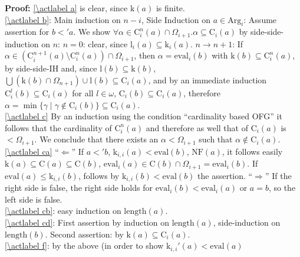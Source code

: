 \documentclass[10pt]{article}
\def \refsub#1#2{\ref{#1#2}}                    %
\def \refact#1{\ref{\actlabel#1}}               %
\def \refcom#1#2{\ref{#1}\ \ref{#1#2}}%
\def\all{\forall}
\def\ar{\rightarrow}
\def \Ar{\Rightarrow}
\def\length{\mathrm{length}}
\def\Arg{\mathrm{Arg}}
\def\k{\mathrm{k}}
\def\lrm{\mathrm{l}}
\def\eval{\mathrm{eval}}
\def\C{\mathrm{C}}
\def\NF{\mathrm{NF}}
\begin{document}
%
%
%
{\bf Proof:} \refact a is clear, since $\k(a)$ is finite.\\ 
\refact b: Main induction on $n-i$, Side Induction on $a \in \Arg_i$:
Assume assertion for $b <' a$. We show 
$\all \alpha  \in \C_i^n(a)\cap \Omega_{i+1}.
\alpha \subseteq \C_i(a)$ by side-side-induction
on $n$: $n=0$: clear, since $\lrm_i(a) \subseteq \k_i(a)$.
$n \ar n+1$: If $\alpha  \in (\C_i^{n+1}(a) \setminus \C_i^n(a))\cap 
\Omega_{i+1}$, then $\alpha = \eval_i(b)$ with
$\k(b) \subseteq \C_i^n(a)$,
by side-side-IH and, since $\lrm(b) \subseteq \k(b)$, 
$\bigcup (\k(b) \cap \Omega_{n+1} ) \cup \lrm(b) \subseteq \C_i(a)$,
and by an immediate induction $\C_i^l(b) \subseteq \C_i(a)$ for
all $l \in \omega$, 
$\C_i(b) \subseteq \C_i(a)$, therefore
$\alpha = \min \{ \gamma \mid \gamma \not \in \C_i(b) \}
\subseteq \C_i(a)$.\\ 
\refact c By an induction using the condition ``cardinality based
OFG'' it follows that the cardinality of $\C_i^n(a)$ and therefore 
as well that of $\C_i(a)$ is $< \Omega_{i+1}$. We conclude that 
there exists an $\alpha  < \Omega_{i+1}$ such that
$\alpha \not \in \C_i(a)$.\\
\refact{ca} ``$\Leftarrow$'' If $a<'b$, $\k_{i,i}(a) < \eval(b)$,
$\NF(a)$,
it follows easily $\k(a) \subseteq \C(a) \subseteq \C(b)$,
$\eval_i(a) \in \C(b) \cap \Omega_{i+1} = \eval_i(b)$.
If $\eval(a)  \leq \k_{i,i}(b)$, 
follows by $\k_{i,i}(b) < \eval(b)$ the assertion.
``$\Rightarrow$'' If the right side is false, the right side holds
for $\eval_i(b)< \eval_i(a)$ or $a=b$, so the left side is false.\\
\refact{cb}: easy induction on $\length(a)$.\\
\refact{cd}: First assertion by induction on $\length(a)$,
side-induction on $\length(b)$.
Second assertion: by $\k(a) \subseteq \C_i(a)$.\\
\refact f: by the above (in order to show $\k_{i,i}'(a)< \eval(a)$ 
\end{document}
